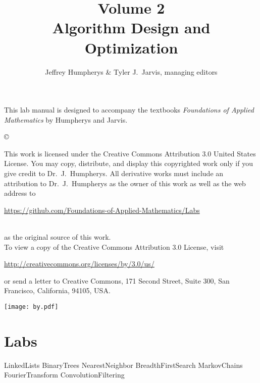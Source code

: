 \documentclass[opener-c,labs,red,nociteref]{HJnewsiambook}
\title{Volume 2\\ Algorithm Design and Optimization}
\author{Jeffrey Humpherys \& Tyler J.~Jarvis, managing editors}
\begin{document}

\thispagestyle{empty} %
\maketitle
\thispagestyle{empty}
\frontmatter



\begin{thepreface} %

This lab manual is designed to accompany the textbooks \emph{Foundations of Applied Mathematics} by Humpherys and Jarvis.

\vfill
\copyright{This work is licensed under the Creative Commons Attribution 3.0 United States
License.  You may copy, distribute, and display this copyrighted work only if you give
credit to Dr.~J.~Humpherys. All derivative works must include an attribution to Dr.~J.~Humpherys as the owner of this work as well as the web address to
\\\centerline{\url{https://github.com/Foundations-of-Applied-Mathematics/Labs}}\\as the original source of this work.
\\To view a copy of the Creative Commons Attribution 3.0 License, visit
\\\centerline{\url{http://creativecommons.org/licenses/by/3.0/us/}} or send a letter to Creative Commons, 171 Second Street, Suite 300, San Francisco, California, 94105, USA.}

\vfill
\centering\texttt{[image: by.pdf]}
\vfill
\end{thepreface}

\setcounter{tocdepth}{1}
\tableofcontents

\mainmatter %

\part{Labs}
{LinkedLists}
{BinaryTrees}
{NearestNeighbor}
{BreadthFirstSearch}
{MarkovChains}
{FourierTransform}
{ConvolutionFiltering}
\end{document}
